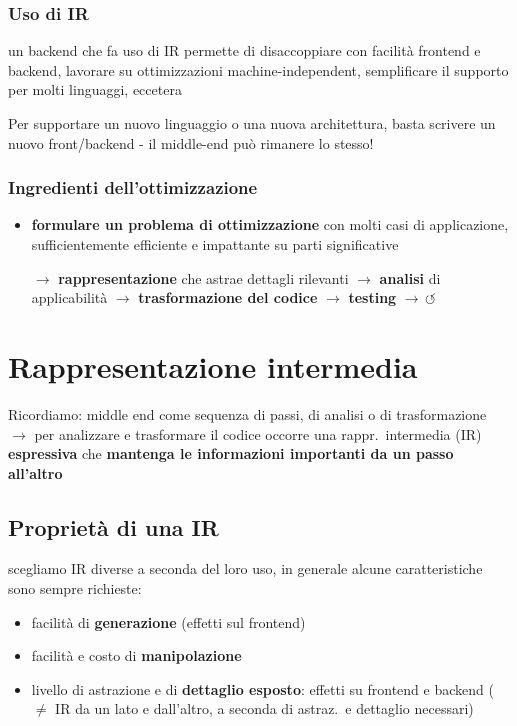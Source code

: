 \subsubsection{Uso di IR}

un backend che fa uso di IR permette di disaccoppiare con facilit\`a frontend e backend, lavorare su ottimizzazioni machine-independent, semplificare il supporto per molti linguaggi, eccetera

\begin{emphasize}
  Per supportare un nuovo linguaggio o una nuova architettura, basta scrivere un nuovo front/backend - il middle-end pu\`o rimanere lo stesso!
\end{emphasize}

\subsubsection{Ingredienti dell'ottimizzazione}

\begin{itemize}
  \item \textbf{formulare un problema di ottimizzazione} con molti casi di applicazione, sufficientemente efficiente e impattante su parti significative
  \item[$\rightarrow$] \textbf{rappresentazione} che astrae dettagli rilevanti $\rightarrow$ \textbf{analisi} di applicabilit\`a $\rightarrow$ \textbf{trasformazione del codice} $\rightarrow$ \textbf{testing} $\rightarrow \, \circlearrowleft$
\end{itemize}

\vspace{-2em}
\section{Rappresentazione intermedia}

Ricordiamo: middle end come sequenza di passi, di analisi o di trasformazione $\rightarrow$ per analizzare e trasformare il codice occorre una rappr.~intermedia (IR) \textbf{espressiva} che \textbf{mantenga le informazioni importanti da un passo all'altro}

\vspace{-1em}
\subsection{Propriet\`a di una IR}

scegliamo IR diverse a seconda del loro uso, in generale alcune caratteristiche sono sempre richieste:
\begin{itemize}
  \item facilit\`a di \textbf{generazione} (effetti sul frontend)
  \item facilit\`a e costo di \textbf{manipolazione}
  \item livello di astrazione e di \textbf{dettaglio esposto}: effetti su frontend e backend ($\neq$ IR da un lato e dall'altro, a seconda di astraz.~e dettaglio necessari)
\end{itemize}

